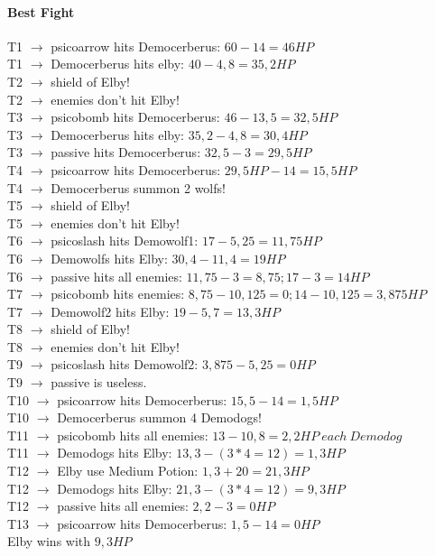 \paragraph*{Best Fight\\}
T1 $\rightarrow$ psicoarrow hits Democerberus: $60 - 14 = 46 HP$\\
T1 $\rightarrow$ Democerberus hits elby: $40 - 4,8 = 35,2 HP$\\
T2 $\rightarrow$ shield of Elby!\\
T2 $\rightarrow$ enemies don’t hit Elby!\\
T3 $\rightarrow$ psicobomb hits Democerberus: $46 - 13,5 = 32,5 HP$\\
T3 $\rightarrow$ Democerberus hits elby: $35,2 - 4,8 = 30,4 HP$\\
T3 $\rightarrow$ passive hits Democerberus: $32,5 - 3 = 29,5 HP$\\
T4 $\rightarrow$ psicoarrow hits Democerberus: $29,5 HP - 14 = 15,5 HP$\\
T4 $\rightarrow$ Democerberus summon 2 wolfs!\\
T5 $\rightarrow$ shield of Elby!\\
T5 $\rightarrow$ enemies don’t hit Elby!\\
T6 $\rightarrow$ psicoslash hits Demowolf1: $17 - 5,25 = 11,75 HP$\\
T6 $\rightarrow$ Demowolfs hits Elby: $30,4 - 11,4 = 19 HP$\\
T6 $\rightarrow$ passive hits all enemies: $11,75 - 3 = 8,75; 17 - 3 = 14 HP$\\
T7 $\rightarrow$ psicobomb hits enemies: $8,75 - 10,125 = 0; 14 - 10,125 = 3,875 HP$\\
T7 $\rightarrow$ Demowolf2 hits Elby: $19 - 5,7  = 13,3 HP$\\
T8 $\rightarrow$ shield of Elby!\\
T8 $\rightarrow$ enemies don’t hit Elby!\\
T9 $\rightarrow$ psicoslash hits Demowolf2: $3,875 - 5,25 = 0 HP$\\
T9 $\rightarrow$ passive is useless.\\
T10 $\rightarrow$ psicoarrow hits Democerberus: $15,5 - 14 = 1,5 HP$\\
T10 $\rightarrow$ Democerberus summon 4 Demodogs!\\
T11 $\rightarrow$ psicobomb hits all enemies: $13 - 10,8 = 2,2 HP\:each\:Demodog$\\
T11 $\rightarrow$ Demodogs hits Elby: $13,3 - (3*4 = 12) = 1,3 HP$\\
T12 $\rightarrow$ Elby use Medium Potion: $1,3 + 20 = 21,3 HP$\\
T12 $\rightarrow$ Demodogs hits Elby: $21,3 - (3*4 = 12) = 9,3 HP$\\
T12 $\rightarrow$ passive hits all enemies: $2,2 - 3 = 0 HP$\\
T13 $\rightarrow$ psicoarrow hits Democerberus: $1,5 - 14 = 0 HP$\\
Elby wins with $9,3 HP$\\
